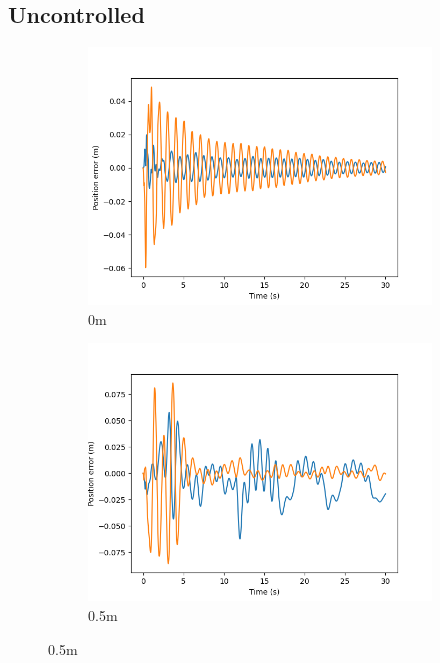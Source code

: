 \documentclass[class=article, crop=false]{standalone}
\begin{document}
\subsection{Uncontrolled}
\begin{figure}
    \centering
    \begin{subfigure}[b]{0.48\textwidth}
        \centering
        \includegraphics{scenario1/rov-0m/0.0m/rov_position_error_uncontrolled}
        \caption{0m}
        \label{}
    \end{subfigure}
    \hfill
    \begin{subfigure}[b]{0.48\textwidth}
        \centering
        \includegraphics{scenario1/rov-0m/0.5m/rov_position_error_uncontrolled}
        \caption{0.5m}

\end{subfigure}
\end{figure}
\end{document}
